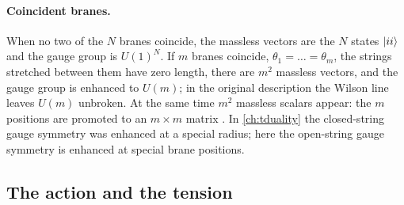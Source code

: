\paragraph{Coincident branes.} When no two of the $N$ branes coincide, the massless vectors are
the $N$ states $|ii\rangle$ and the gauge group is $U(1)^N$. If $m$ branes coincide,
$\theta_1=\dots=\theta_m$, the strings stretched between them have zero length, there are $m^2$
massless vectors, and the gauge group is enhanced to $U(m)$; in the original description the
Wilson line leaves $U(m)$ unbroken. At the same time $m^2$ massless scalars appear: the $m$
positions are promoted to an $m\times m$ matrix . In \cref{ch:tduality} the closed-string gauge symmetry was enhanced at a special radius; here
the open-string gauge symmetry is enhanced at special brane positions.

\subsection{The action and the tension}


